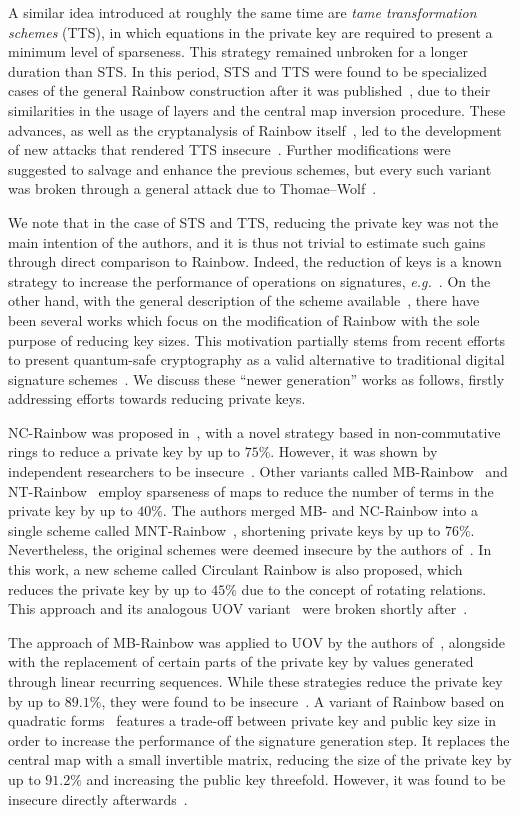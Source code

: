 \documentclass[draft, 12pt, a4paper, oneside]{memoir}
\begin{document}
A similar idea introduced at roughly the same time are \emph{tame transformation schemes} (TTS), in which equations in the private key are required to present a minimum level of sparseness. This strategy remained unbroken for a longer duration than STS. In this period, STS and TTS were found to be specialized cases of the general Rainbow construction after it was published~\cite{}, due to their similarities in the usage of layers and the central map inversion procedure. These advances, as well as the cryptanalysis of Rainbow itself~\cite{}, led to the development of new attacks that rendered TTS insecure~\cite{}. Further modifications were suggested to salvage and enhance the previous schemes, but every such variant was broken through a general attack due to Thomae--Wolf~\cite{}.

We note that in the case of STS and TTS, reducing the private key was not the main intention of the authors, and it is thus not trivial to estimate such gains through direct comparison to Rainbow. Indeed, the reduction of keys is a known strategy to increase the performance of operations on signatures, \emph{e.g.}~\cite{}. On the other hand, with the general description of the scheme available~\cite{}, there have been several works which focus on the modification of Rainbow with the sole purpose of reducing key sizes. This motivation partially stems from recent efforts to present quantum-safe cryptography as a valid alternative to traditional digital signature schemes~\cite{}. We discuss these ``newer generation''  works as follows, firstly addressing efforts towards reducing private keys.

NC-Rainbow was proposed in~\cite{}, with a novel strategy based in non-commutative rings to reduce a private key by up to $75\%$. However, it was shown by independent researchers to be insecure~\cite{}. Other variants called MB-Rainbow~\cite{} and NT-Rainbow~\cite{} employ sparseness of maps to reduce the number of terms in the private key by up to $40\%$. The authors merged MB- and NC-Rainbow into a single scheme called MNT-Rainbow~\cite{}, shortening private keys by up to $76\%$. Nevertheless, the original schemes were deemed insecure by the authors of~\cite{}. In this work, a new scheme called Circulant Rainbow is also proposed, which reduces the private key by up to $45\%$ due to the concept of rotating relations. This approach and its analogous UOV variant~\cite{} were broken shortly after~\cite{}.

The approach of MB-Rainbow was applied to UOV by the authors of~\cite{}, alongside with the replacement of certain parts of the private key by values generated through linear recurring sequences. While these strategies reduce the private key by up to $89.1\%$, they were found to be insecure~\cite{}. A variant of Rainbow based on quadratic forms~\cite{} features a trade-off between private key and public key size in order to increase the performance of the signature generation step. It replaces the central map with a small invertible matrix, reducing the size of the private key by up to $91.2\%$ and increasing the public key threefold. However, it was found to be insecure directly afterwards~\cite{}.
\end{document}
